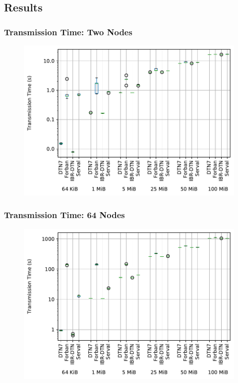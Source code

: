 \subsection{Results}

\begin{frame}
  \frametitle{Transmission Time: Two Nodes}

  \begin{figure}
    \includegraphics[width=\linewidth,keepaspectratio]{include/chain-runtimes-2}
  \end{figure}
\end{frame}

\begin{frame}
  \frametitle{Transmission Time: 64 Nodes}

  \begin{figure}
    \includegraphics[width=\linewidth,keepaspectratio]{include/chain-runtimes-64}
  \end{figure}
\end{frame}

